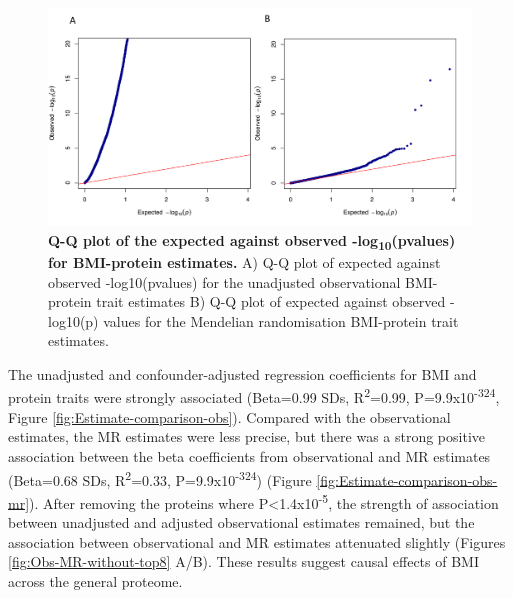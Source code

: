\documentclass[11pt,twoside]{bristolthesis}
\begin{document}
\begin{figure}

{\centering \includegraphics[width=0.95\linewidth]{figure/BMI_protein_INTERVAL/QQ_obs_MR} 

}

\caption[Q-Q plot of the expected against observed -log\textsubscript{10}(pvalues) for BMI-protein estimates]{\textbf{Q-Q plot of the expected against observed -log\textsubscript{10}(pvalues) for BMI-protein estimates.} A) Q-Q plot of expected against observed -log10(pvalues) for the unadjusted observational BMI-protein trait estimates B) Q-Q plot of expected against observed -log10(p) values for the Mendelian randomisation BMI-protein trait estimates.}\label{fig:QQ-obs-MR}
\end{figure}
The unadjusted and confounder-adjusted regression coefficients for BMI and protein traits were strongly associated (Beta=0.99 SDs, R\textsuperscript{2}=0.99, P=9.9x10\textsuperscript{-324}, Figure \ref{fig:Estimate-comparison-obs}). Compared with the observational estimates, the MR estimates were less precise, but there was a strong positive association between the beta coefficients from observational and MR estimates (Beta=0.68 SDs, R\textsuperscript{2}=0.33, P=9.9x10\textsuperscript{-324}) (Figure \ref{fig:Estimate-comparison-obs-mr}). After removing the proteins where P\textless1.4x10\textsuperscript{-5}, the strength of association between unadjusted and adjusted observational estimates remained, but the association between observational and MR estimates attenuated slightly (Figures \ref{fig:Obs-MR-without-top8} A/B). These results suggest causal effects of BMI across the general proteome.
\end{document}

